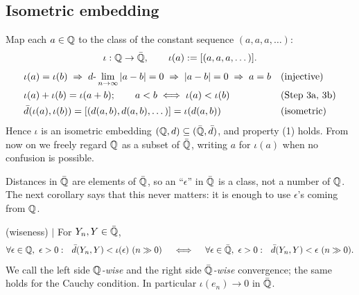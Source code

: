 

\subsection{Isometric embedding} \label{sec:embed}

Map each $a\in\mathbb{Q}$ to the class of the constant sequence $(a,a,a,\dots)$:
\[
\iota:\mathbb{Q}\to\bar{\mathbb{Q}},\qquad \iota(a):=[(a,a,a,\dots)].
\]
\begin{align*}
&\iota(a)=\iota(b) \;\Rightarrow\; d\text{-}\lim_{n\to\infty}|a-b|=0 \;\Rightarrow\; |a-b|=0 \;\Rightarrow\; a=b
&&\text{(injective)}\\
&\iota(a)+\iota(b)=\iota(a+b);\qquad a<b\iff\iota(a)<\iota(b)
&&\text{(Step 3a, 3b)}\\
&\bar{d}(\iota(a),\iota(b))=[(d(a,b),d(a,b),\dots)]=\iota(d(a,b))
&&\text{(isometric)}
\end{align*}
Hence $\iota$ is an isometric embedding $(\mathbb{Q},d)\subseteq(\bar{\mathbb{Q}},\bar{d})$, and
property (1) holds. From now on we freely regard $\mathbb{Q}$ as a subset of $\bar{\mathbb{Q}}$,
writing $a$ for $\iota(a)$ when no confusion is possible.

Distances in $\bar{\mathbb{Q}}$ are elements of $\bar{\mathbb{Q}}$, so an ``$\epsilon$'' in $\bar{\mathbb{Q}}$ is a
class, not a number of $\mathbb{Q}$. The next corollary says that this never matters:
it is enough to use $\epsilon$'s coming from $\mathbb{Q}$.

\begin{corollary} (wiseness) $\mid$ \label{cor:wise}
For $Y_n,Y\in\bar{\mathbb{Q}}$,
\[
\forall\epsilon\in\Q,\ \epsilon>0:\ \ \db(Y_n,Y)<\iota(\epsilon)\ev
\quad\iff\quad
\forall\epsilon\in\Qb,\ \epsilon>0:\ \ \db(Y_n,Y)<\epsilon\ev .
\]
We call the left side \emph{$\mathbb{Q}$-wise} and the right side \emph{$\bar{\mathbb{Q}}$-wise}
convergence; the same holds for the Cauchy condition. In particular
$\iota(e_n)\to0$ in $\bar{\mathbb{Q}}$.
\end{corollary}




